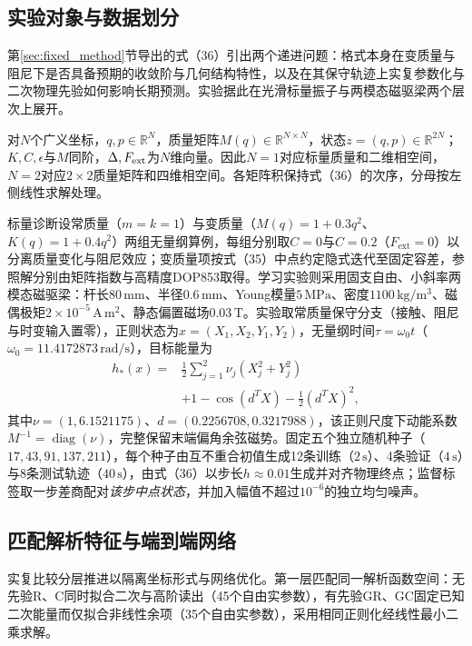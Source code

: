 \subsection{实验对象与数据划分}
第\ref{sec:fixed_method}节导出的式（36）引出两个递进问题：格式本身在变质量与阻尼下是否具备预期的收敛阶与几何结构特性，以及在其保守轨迹上实复参数化与二次物理先验如何影响长期预测。实验据此在光滑标量振子与两模态磁驱梁两个层次上展开。

对$N$个广义坐标，$q,p\in\mathbb R^N$，质量矩阵$M(q)\in\mathbb R^{N\times N}$，状态$z=(q,p)\in\mathbb R^{2N}$；$K,C,\epsilon$与$M$同阶，$\Delta,F_{\rm ext}$为$N$维向量。因此$N=1$对应标量质量和二维相空间，$N=2$对应$2\times2$质量矩阵和四维相空间。各矩阵积保持式（36）的次序，分母按左侧线性求解处理。

标量诊断设常质量（$m=k=1$）与变质量（$M(q)=1+0.3q^2$、$K(q)=1+0.4q^2$）两组无量纲算例，每组分别取$C=0$与$C=0.2$（$F_{\mathrm{ext}}=0$）以分离质量变化与阻尼效应；变质量项按式（35）中点约定隐式迭代至固定容差，参照解分别由矩阵指数与高精度DOP853取得。学习实验则采用固支自由、小斜率两模态磁驱梁：杆长$80\,\mathrm{mm}$、半径$0.6\,\mathrm{mm}$、Young模量$5\,\mathrm{MPa}$、密度$1100\,\mathrm{kg/m^3}$、磁偶极矩$2\times10^{-5}\,\mathrm{A\,m^2}$、静态偏置磁场$0.03\,\mathrm T$。实验取常质量保守分支（接触、阻尼与时变输入置零），正则状态为$x=(X_1,X_2,Y_1,Y_2)$，无量纲时间$\tau=\omega_0t$（$\omega_0=11.4172873\,\mathrm{rad/s}$），目标能量为
\begin{equation}
 \begin{aligned}
 h_*(x)={}&\frac12\sum_{j=1}^{2}\nu_j(X_j^2+Y_j^2)\\
          &+1-\cos(d^TX)-\frac12(d^TX)^2,
 \end{aligned}
 \label{eq:learning-model}
\end{equation}
其中$\nu=(1,6.1521175)$、$d=(0.2256708,0.3217988)$，该正则尺度下动能系数$M^{-1}=\operatorname{diag}(\nu)$，完整保留末端偏角余弦磁势。固定五个独立随机种子（$17,43,91,137,211$），每个种子由互不重合初值生成12条训练（$2\,\mathrm s$）、4条验证（$4\,\mathrm s$）与8条测试轨迹（$40\,\mathrm s$），由式（36）以步长$h\approx0.01$生成并对齐物理终点；监督标签取一步差商配对\emph{该步中点状态}，并加入幅值不超过$10^{-6}$的独立均匀噪声。

\subsection{匹配解析特征与端到端网络}
实复比较分层推进以隔离坐标形式与网络优化。第一层匹配同一解析函数空间：无先验R、C同时拟合二次与高阶读出（45个自由实参数），有先验GR、GC固定已知二次能量而仅拟合非线性余项（35个自由实参数），采用相同正则化经线性最小二乘求解。

